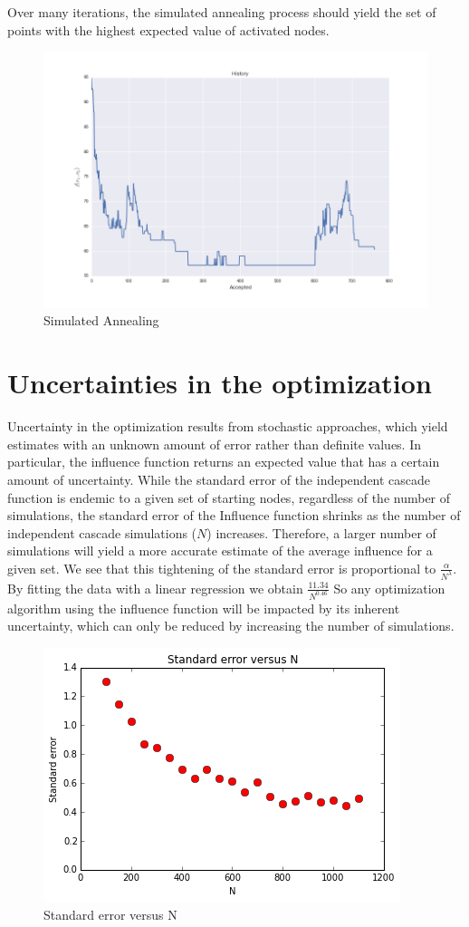 \documentclass[11pt]{scrartcl} %
\begin{document}
Over many iterations, the simulated annealing process should yield the set of points with the highest expected value of activated nodes. 

\begin{figure}[h!]
\centering
\includegraphics[width=10 cm]{SimAn}
\caption{Simulated Annealing}
\label{fig:SA}
\end{figure}

\section{Uncertainties in the optimization}

Uncertainty in the optimization results from stochastic approaches, which yield estimates with an unknown amount of error rather than definite values.  In particular, the influence function returns an expected value that has a certain amount of uncertainty.  While the standard error of the independent cascade function is endemic to a given set of starting nodes, regardless of the number of simulations, the standard error of the Influence function shrinks as the number of independent cascade simulations ($N$) increases.  Therefore, a larger number of simulations will yield a more accurate estimate of the average influence for a given set.  We see that this tightening of the standard error is proportional to $\frac{\alpha}{N^{\lambda}}$. By fitting the data with a linear regression we obtain  $\frac{11.34}{N^{0.46}}$   So any optimization algorithm using the influence function will be impacted by its inherent uncertainty, which can only be reduced by increasing the number of simulations.  
	
\begin{figure}
\centering
\includegraphics[width=10 cm]{StandardErrorVsN}
\caption{Standard error versus N}
\label{fig:StandardError}
\end{figure}
\end{document}
